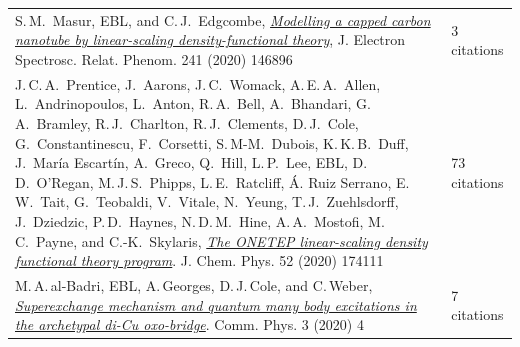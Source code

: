 \documentclass[10pt,a4paper,final]{article}
\begin{document}
\begin{tabularx}{\textwidth}{
      m{}%
      m{}}
   S.\,M.\ Masur, EBL, and C.\,J.\ Edgcombe, \href{https://www.sciencedirect.com/science/article/pii/S036820481930221X}{\textit{Modelling a capped carbon nanotube by linear-scaling density-functional theory}}, J. Electron Spectrosc. Relat. Phenom. 241 (2020) 146896                                                                                                                                                                                                                                                                                                                                                                                                                                                                                     & 3 citations                                     \\
   J.\,C.\,A.\ Prentice, J.\ Aarons, J.\,C.\ Womack, A.\,E.\,A.\ Allen, L.\ Andrinopoulos, L.\ Anton, R.\,A.\ Bell, A.\ Bhandari, G.\,A.\ Bramley, R.\,J.\ Charlton, R.\,J.\ Clements, D.\,J.\ Cole, G.\ Constantinescu, F.\ Corsetti, S.\,M-M.\ Dubois, K.\,K.\,B.\ Duff, J.\ María Escartín, A.\ Greco, Q.\ Hill, L.\,P.\ Lee, EBL, D.\,D.\ O’Regan, M.\,J.\,S.\ Phipps, L.\,E.\ Ratcliff, Á. Ruiz Serrano, E.\,W.\ Tait, G.\ Teobaldi, V.\ Vitale, N.\ Yeung, T.\,J.\ Zuehlsdorff, J.\ Dziedzic, P.\,D.\ Haynes, N.\,D.\,M.\ Hine, A.\,A.\ Mostofi, M.\,C.\ Payne, and C.-K.\ Skylaris, \href{https://aip.scitation.org/doi/full/10.1063/5.0004445}{\textit{The ONETEP linear-scaling density functional theory program}}. J. Chem. Phys. 52 (2020) 174111 & 73 citations                                    \\
   M.\,A.\,al-Badri, EBL, A.\,Georges, D.\,J.\,Cole, and C.\,Weber, \href{https://www.nature.com/articles/s42005-019-0270-1}{\textit{Superexchange mechanism and quantum many body excitations in the archetypal di-Cu oxo-bridge}}. Comm. Phys. 3 (2020) 4                                                                                                                                                                                                                                                                                                                                                                                                                                                                                                   & 7 citations                                     \\

\end{tabularx}
\end{document}
